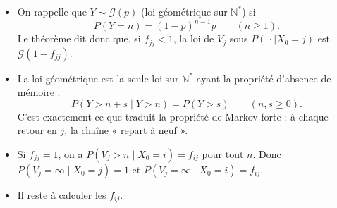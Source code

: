 \begin{remarque}
\begin{itemize}
\item On rappelle que $Y\sim\mathcal G(p)$ (loi géométrique sur $\mathbb N^*$) si
\[
P(Y=n)=(1-p)^{n-1}p\qquad(n\ge1).
\]
Le théorème dit donc que, si $f_{jj}<1$, la loi de $V_j$ sous $P(\,\cdot\mid X_0=j)$ est $\mathcal G(1-f_{jj})$.
\item La loi géométrique est la seule loi sur $\mathbb N^*$ ayant la propriété d'absence de mémoire :
\[
P(Y>n+s\mid Y>n)=P(Y>s)\qquad(n,s\ge0).
\]
C'est exactement ce que traduit la propriété de Markov forte : à chaque retour en $j$, la chaîne « repart à neuf ».
\item Si $f_{jj}=1$, on a $P(V_j>n\mid X_0=i)=f_{ij}$ pour tout $n$. Donc $P(V_j=\infty\mid X_0=j)=1$ et $P(V_j=\infty\mid X_0=i)=f_{ij}$.
\item Il reste à calculer les $f_{ij}$.
\end{itemize}
\end{remarque}

